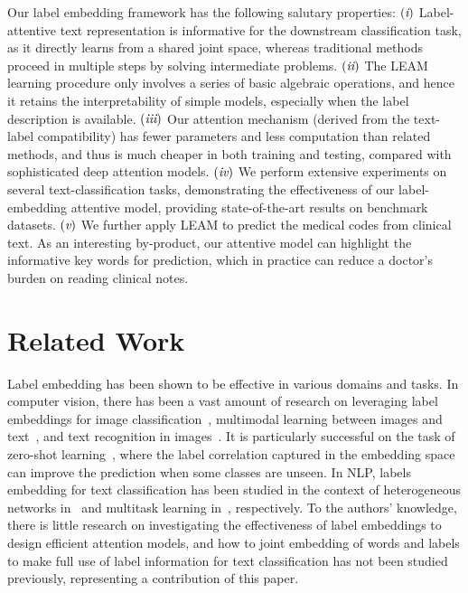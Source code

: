 \documentclass[11pt,a4paper]{article}
\newcommand{\RN}[1]{\textup{\lowercase\expandafter{\it \romannumeral#1}}}
\begin{document}
Our label embedding framework has the following salutary properties:
$(\RN{1})$ Label-attentive text representation is informative for the downstream classification task, as it directly learns from a shared joint space, whereas traditional methods proceed in multiple steps by solving intermediate problems.
$(\RN{2})$  The LEAM learning procedure only involves a series of basic algebraic operations, and hence it retains the interpretability of simple models, especially when the label description is available.
$(\RN{3})$ Our attention mechanism (derived from the text-label compatibility) has fewer parameters and less computation than related methods, and thus is much cheaper in both training and testing, compared with sophisticated deep attention models.
$(\RN{4})$  We perform extensive experiments on several text-classification tasks, demonstrating the effectiveness of our label-embedding attentive model, providing state-of-the-art results on benchmark datasets.
$(\RN{5})$ We further apply LEAM to predict the medical codes from clinical text. As an interesting by-product, our attentive model can highlight the informative key words for prediction, which in practice can reduce a doctor's burden on reading clinical notes.


\section{Related Work}
Label embedding has been shown to be effective in various domains and tasks.
In computer vision, there has been a vast amount of research on leveraging label embeddings for image classification~\citep{akata2016label}, multimodal learning between images and text~\citep{frome2013devise,kiros2014unifying}, and text recognition in images~\cite{rodriguez2013label}. It is particularly successful on the task of zero-shot learning~\cite{palatucci2009zero,yogatama2015embedding,ma2016label}, where the label correlation captured in the embedding space can improve the prediction when some classes are unseen.  
In NLP, labels embedding for text classification has been studied in the context of heterogeneous networks in~\citep{tang2015pte} and multitask learning in~\citep{zhang2017multi}, respectively.
To the authors' knowledge, there is little research on investigating the effectiveness of label embeddings to design efficient attention models, and how to joint embedding of words and labels to make full use of label information for text classification has not been studied previously, representing a contribution of this paper.
\end{document}
